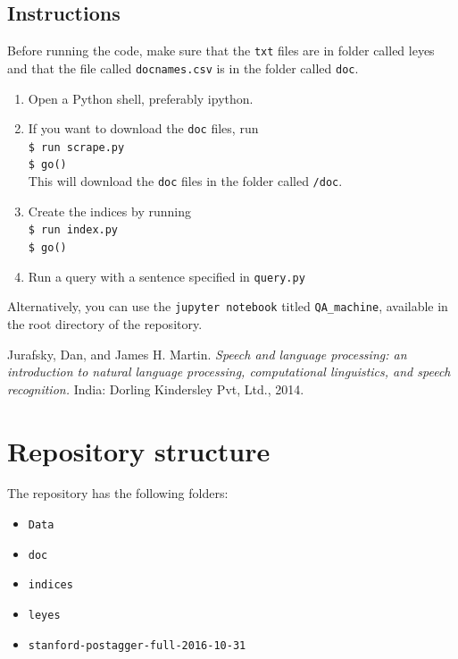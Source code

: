 \documentclass[letterpaper, margin=1in]{article}
\begin{document}
\subsection{Instructions}
Before running the code, make sure that the \texttt{txt} files are in folder called leyes and that the file called \texttt{docnames.csv} is in the folder called \texttt{doc}.

\begin{enumerate}
\item Open a Python shell, preferably ipython.
\item If you want to download the \texttt{doc} files, run \\ \texttt{\$ run scrape.py} \\ \texttt{\$ go()} \\ This will download the \texttt{doc} files in the folder called \texttt{/doc}.
\item Create the indices by running \\ \texttt{\$ run index.py} \\ \texttt{\$ go()}
\item Run a query with a sentence specified in \texttt{query.py}
\end{enumerate}

Alternatively, you can use the \texttt{jupyter notebook} titled \texttt{QA{\_}machine}, available in the root directory of the repository.

\begin{thebibliography}{9}
  Jurafsky, Dan, and James H. Martin. 
  \emph{Speech and language processing: an introduction to natural language processing, computational linguistics, and speech recognition.} 
  India: Dorling Kindersley Pvt, Ltd., 2014.

\end{thebibliography}

\newpage
\appendix

\section{Repository structure}
The repository has the following folders:
\begin{itemize}
\item \texttt{Data}
\item \texttt{doc}
\item \texttt{indices}
\item \texttt{leyes}
\item \texttt{stanford-postagger-full-2016-10-31}
\end{itemize}
\end{document}
